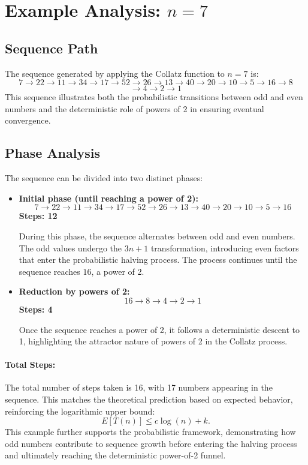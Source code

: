 \section{Example Analysis: \( n = 7 \)}

\subsection{Sequence Path}
The sequence generated by applying the Collatz function to \( n = 7 \) is:
\[
7 \rightarrow 22 \rightarrow 11 \rightarrow 34 \rightarrow 17 \rightarrow 52 \rightarrow 26 \rightarrow 13 \rightarrow 40 \rightarrow 20 \rightarrow 10 \rightarrow 5 \rightarrow 16 \rightarrow 8 \]
\[
 \rightarrow 4 \rightarrow 2 \rightarrow 1
\]
This sequence illustrates both the probabilistic transitions between odd and even numbers and the deterministic role of powers of 2 in ensuring eventual convergence.

\subsection{Phase Analysis}
The sequence can be divided into two distinct phases: 

\begin{itemize}
    \item \textbf{Initial phase (until reaching a power of 2):} 
    \[
    7 \rightarrow 22 \rightarrow 11 \rightarrow 34 \rightarrow 17 \rightarrow 52 \rightarrow 26 \rightarrow 13 \rightarrow 40 \rightarrow 20 \rightarrow 10 \rightarrow 5 \rightarrow 16
    \]
    \textbf{Steps: 12}
    
    During this phase, the sequence alternates between odd and even numbers. The odd values undergo the \( 3n+1 \) transformation, introducing even factors that enter the probabilistic halving process. The process continues until the sequence reaches \( 16 \), a power of 2.
    
    \item \textbf{Reduction by powers of 2:}
    \[
    16 \rightarrow 8 \rightarrow 4 \rightarrow 2 \rightarrow 1
    \]
    \textbf{Steps: 4}
    
    Once the sequence reaches a power of 2, it follows a deterministic descent to 1, highlighting the attractor nature of powers of 2 in the Collatz process.
\end{itemize}

\paragraph{Total Steps:} The total number of steps taken is 16, with 17 numbers appearing in the sequence. This matches the theoretical prediction based on expected behavior, reinforcing the logarithmic upper bound:
\[
E[T(n)] \leq c \log(n) + k.
\]
This example further supports the probabilistic framework, demonstrating how odd numbers contribute to sequence growth before entering the halving process and ultimately reaching the deterministic power-of-2 funnel.
